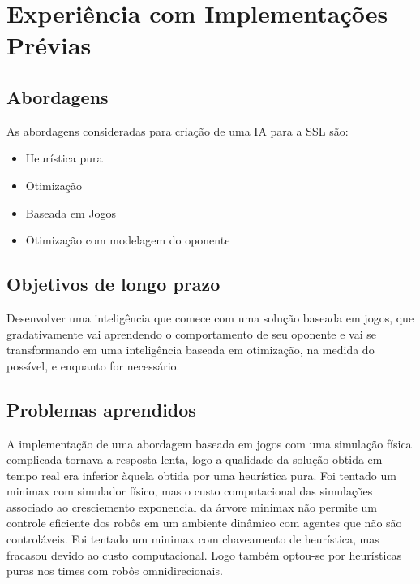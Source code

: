 \chapter{Experiência com Implementações Prévias}\label{cap:licoes_aprendidas}

\section{Abordagens}

As abordagens consideradas para criação de uma IA para a SSL são:
\begin{itemize}
 \item Heurística pura
 \item Otimização
 \item Baseada em Jogos
 \item Otimização com modelagem do oponente
\end{itemize}

\section{Objetivos de longo prazo}

Desenvolver uma inteligência que comece com uma solução baseada em jogos, que
gradativamente vai aprendendo o comportamento de seu oponente e vai se
transformando em uma inteligência baseada em otimização, na medida do possível,
e enquanto for necessário.

\section{Problemas aprendidos}

A implementação de uma abordagem baseada em jogos com uma simulação física
complicada tornava a resposta lenta, logo a qualidade da solução obtida em tempo
real era inferior àquela obtida por uma heurística pura.  Foi tentado um minimax
com simulador físico, mas o custo computacional das simulações associado ao
cresciemento exponencial da árvore minimax não permite um controle eficiente dos
robôs em um ambiente dinâmico com agentes que não são controláveis.  Foi tentado
um minimax com chaveamento de heurística, mas fracasou devido ao custo
computacional. Logo também optou-se por heurísticas puras nos times com robôs
omnidirecionais.

